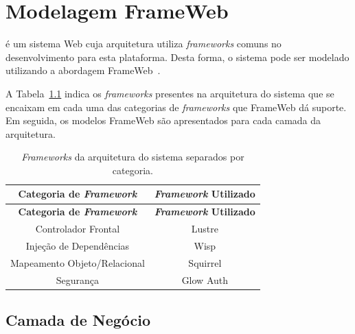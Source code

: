 
\chapter{Modelagem FrameWeb}
\label{sec-frameweb}
\vspace{-1cm}

\emph{\imprimirtitulo} é um sistema Web cuja arquitetura utiliza \textit{frameworks} comuns no desenvolvimento para esta plataforma. Desta forma, o sistema pode ser modelado utilizando a abordagem FrameWeb~\cite{souza-celebratingfalbo20}.

A Tabela~\ref{tabela-frameworks} indica os \textit{frameworks} presentes na arquitetura do sistema que se encaixam em cada uma das categorias de \textit{frameworks} que FrameWeb dá suporte. Em seguida, os modelos FrameWeb são apresentados para cada camada da arquitetura.



\begin{footnotesize}
	\begin{longtable}{|c|c|}
		\caption{\textit{Frameworks} da arquitetura do sistema separados por categoria.}
		\label{tabela-frameworks}\\\hline
		
		\rowcolor{lightgray}
		\textbf{Categoria de \textit{Framework}} & \textbf{\textit{Framework} Utilizado} \\\hline 
		\endfirsthead
		\hline
		\rowcolor{lightgray}
		\textbf{Categoria de \textit{Framework}} & \textbf{\textit{Framework} Utilizado} \\\hline 
		\endhead

		Controlador Frontal & Lustre \\\hline

		Injeção de Dependências & Wisp \\\hline

		Mapeamento Objeto/Relacional & Squirrel \\\hline

		Segurança & Glow Auth \\\hline
	\end{longtable}
\end{footnotesize}




\section{Camada de Negócio}
\label{sec-frameweb-negocio}

